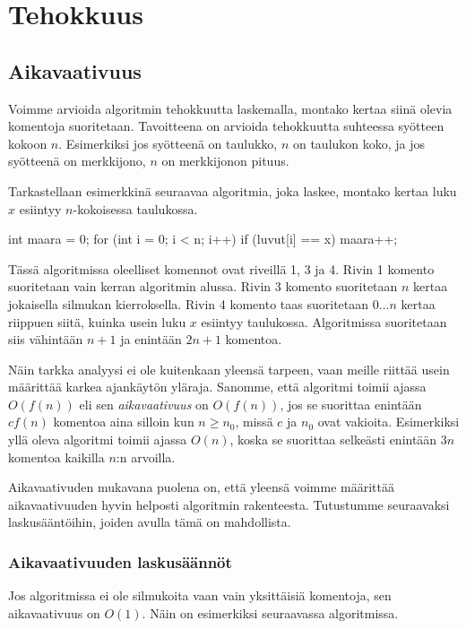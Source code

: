 \chapter{Tehokkuus}

\section{Aikavaativuus}

Voimme arvioida algoritmin tehokkuutta laskemalla,
montako kertaa siinä olevia komentoja suoritetaan.
Tavoitteena on arvioida tehokkuutta suhteessa
syötteen kokoon $n$.
Esimerkiksi jos syötteenä on taulukko,
$n$ on taulukon koko,
ja jos syötteenä on merkkijono,
$n$ on merkkijonon pituus.

Tarkastellaan esimerkkinä seuraavaa algoritmia,
joka laskee, montako kertaa luku $x$ esiintyy
$n$-kokoisessa taulukossa.

\begin{code}[numbers=left]
int maara = 0;
for (int i = 0; i < n; i++) {
    if (luvut[i] == x) {
        maara++;
    }
}
\end{code}

Tässä algoritmissa oleelliset komennot ovat riveillä
1, 3 ja 4.
Rivin 1 komento suoritetaan vain kerran algoritmin alussa.
Rivin 3 komento suoritetaan $n$ kertaa jokaisella silmukan
kierroksella.
Rivin 4 komento taas suoritetaan $0 \dots n$
kertaa riippuen siitä, kuinka usein
luku $x$ esiintyy taulukossa.
Algoritmissa suoritetaan siis vähintään $n+1$ ja enintään $2n+1$
komentoa.

Näin tarkka analyysi ei ole kuitenkaan yleensä tarpeen,
vaan meille riittää usein määrittää karkea ajankäytön yläraja.
Sanomme, että algoritmi toimii ajassa $O(f(n))$ eli sen
\emph{aikavaativuus} on $O(f(n))$, jos se suorittaa
enintään $c f(n)$ komentoa aina silloin kun $n \ge n_0$,
missä $c$ ja $n_0$ ovat vakioita.
Esimerkiksi yllä oleva algoritmi toimii ajassa $O(n)$,
koska se suorittaa selkeästi enintään $3n$ komentoa
kaikilla $n$:n arvoilla.

Aikavaativuden mukavana puolena on, että yleensä voimme
määrittää aikavaativuuden hyvin helposti algoritmin
rakenteesta. Tutustumme seuraavaksi laskusääntöihin,
joiden avulla tämä on mahdollista.

\subsection{Aikavaativuuden laskusäännöt}

Jos algoritmissa ei ole silmukoita vaan vain
yksittäisiä komentoja, sen aikavaativuus on $O(1)$.
Näin on esimerkiksi seuraavassa algoritmissa.

